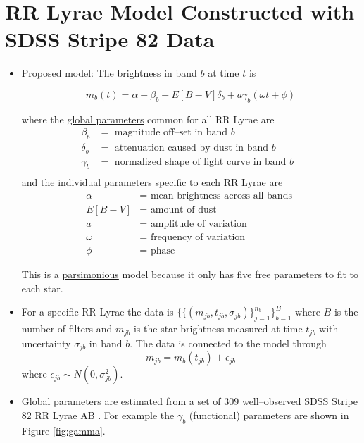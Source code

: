 \documentclass[a0,portrait]{a0poster}
\begin{document}
\begin{multicols}{2}
\begin{itemize}
\end{itemize}


\section*{RR Lyrae Model Constructed with SDSS Stripe 82 Data}

\begin{itemize}
\item Proposed model: The brightness in band $b$ at time $t$ is

{\Large
\begin{equation*}
m_b(t) = \alpha + \beta_b + E[B-V]\delta_b + a\gamma_b(\omega t + \phi)
\end{equation*}
}

where the \underline{global parameters} common for all RR Lyrae are
\begin{align*}
\beta_b &=  \text{ magnitude off--set in band $b$ }\\
\delta_b &= \text{ attenuation caused by dust in band $b$ }\\
\gamma_b &= \text{ normalized shape of light curve in band $b$ }\\
\end{align*}
and the \underline{individual parameters} specific to each RR Lyrae are
\begin{align*}
\alpha &= \text{ mean brightness across all bands }\\
E[B-V] &= \text{ amount of dust }\\
a &= \text{ amplitude of variation }\\
\omega &= \text{ frequency of variation }\\
\phi &= \text{ phase }
\end{align*}

This is a \underline{parsimonious} model because it only has five free parameters to fit to each star.

\item For a specific RR Lyrae the data is $\{\{(m_{jb},t_{jb},\sigma_{jb})\}_{j=1}^{n_b}\}_{b=1}^B$ where $B$ is the number of filters and $m_{jb}$ is the star brightness measured at time $t_{jb}$ with uncertainty $\sigma_{jb}$ in band $b$. The data is connected to the model through
\begin{equation*}
m_{jb} = m_b(t_{jb}) + \epsilon_{jb}
\end{equation*}
where $\epsilon_{jb} \sim N(0,\sigma_{jb}^2)$. 

\item \underline{Global parameters} are estimated from a set of 309 well--observed SDSS Stripe 82 RR Lyrae AB \cite{sesar2010light}. For example the $\gamma_b$ (functional) parameters are shown in Figure \ref{fig:gamma}. 


\end{itemize}
\end{multicols}
\end{document}
